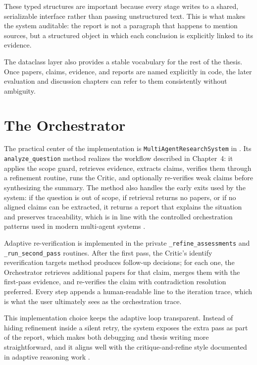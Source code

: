 These typed structures are important because every stage writes to a shared, serializable interface rather than
passing unstructured text. This is what makes the system auditable: the report is not a paragraph that happens to
mention sources, but a structured object in which each conclusion is explicitly linked to its evidence.

The dataclass layer also provides a stable vocabulary for the rest of the thesis. Once papers, claims, evidence,
and reports are named explicitly in code, the later evaluation and discussion chapters can refer to them
consistently without ambiguity.

\section{The Orchestrator }

The practical center of the implementation is \texttt{MultiAgentResearchSystem}
in . Its \texttt{analyze\_question} method
realizes the workflow described in Chapter~4: it applies the scope
guard, retrieves evidence, extracts claims, verifies them through a
refinement routine, runs the Critic, and optionally re-verifies weak
claims before synthesizing the summary. The method also handles the
early exits used by the system: if the question is out of scope, if
retrieval returns no papers, or if no aligned claims can be extracted,
it returns a report that explains the situation and preserves
traceability, which is in line with the controlled orchestration patterns used in modern multi-agent systems \cite{wu2023autogen,shinn2023reflexion}.

Adaptive re-verification is implemented in the private
\texttt{\_refine\_assessments} and \texttt{\_run\_second\_pass}
routines. After the first pass, the Critic's identify reverification targets method produces follow-up
decisions; for each one, the Orchestrator retrieves additional papers
for that claim, merges them with the first-pass evidence, and
re-verifies the claim with contradiction resolution preferred. Every
step appends a human-readable line to the iteration trace, which is
what the user ultimately sees as the orchestration trace.

This implementation choice keeps the adaptive loop transparent. Instead of hiding refinement inside a silent
retry, the system exposes the extra pass as part of the report, which makes both debugging and thesis writing
more straightforward, and it aligns well with the critique-and-refine style documented in adaptive reasoning work \cite{yao2023treeofthoughts,asai2024selfrag}.

